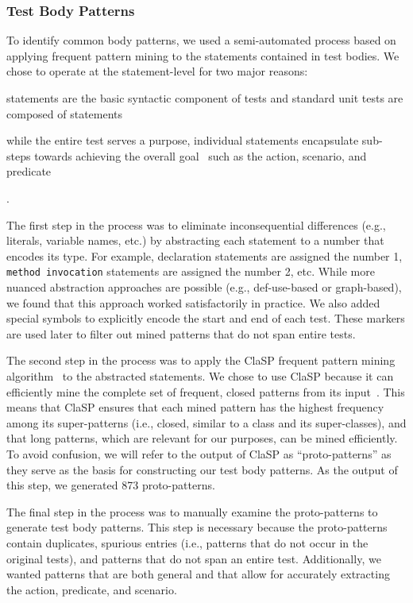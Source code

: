 \documentclass[proposal.tex]{subfiles}
\begin{document}
\subsubsection{Test Body Patterns}
\label{sec:body-patterns}


To identify common body patterns, we used a semi-automated process based on applying frequent pattern mining to the statements contained in test bodies.
%
We chose to operate at the statement-level for two major reasons:
\begin{enumerate*}
    \item statements are the basic syntactic component of tests and standard unit tests are composed of statements~\cite{JUnitCook}
    \item while the entire test serves a purpose, individual statements encapsulate sub-steps towards achieving the overall goal~\cite{lakhotia1993understanding} such as the action, scenario, and predicate 
\end{enumerate*}.


The first step in the process was to eliminate inconsequential differences (e.g., literals, variable names, etc.) by abstracting each statement to a number that encodes its type.
%
For example, declaration statements are assigned the number \num{1}, \texttt{method invocation} statements are assigned the number \num{2}, etc.
%
While more nuanced abstraction approaches are possible (e.g., def-use-based or graph-based), we found that this approach worked satisfactorily in practice.
%
We also added special symbols to explicitly encode the start and end of each test.
%
These markers are used later to filter out mined patterns that do not span entire tests.


The second step in the process was to apply the ClaSP frequent pattern mining algorithm~\cite{gomariz2013clasp} to the abstracted statements.
%
We chose to use ClaSP because it can efficiently mine the complete set of frequent, closed patterns from its input~\cite{fournier2017survey}.
%
This means that ClaSP ensures that each mined pattern has the highest frequency among its super-patterns (i.e., closed, similar to a class and its super-classes), and that long patterns, which are relevant for our purposes, can be mined efficiently.
%
To avoid confusion, we will refer to the output of ClaSP as \enquote{proto-patterns} as they serve as the basis for constructing our test body patterns.
%
As the output of this step, we generated \num{873} proto-patterns.


The final step in the process was to manually examine the proto-patterns to generate test body patterns.
%
This step is necessary because the proto-patterns contain duplicates, spurious entries (i.e., patterns that do not occur in the original tests), and patterns that do not span an entire test.
%
Additionally, we wanted patterns that are both general and that allow for accurately extracting the action, predicate, and scenario.
\end{document}
